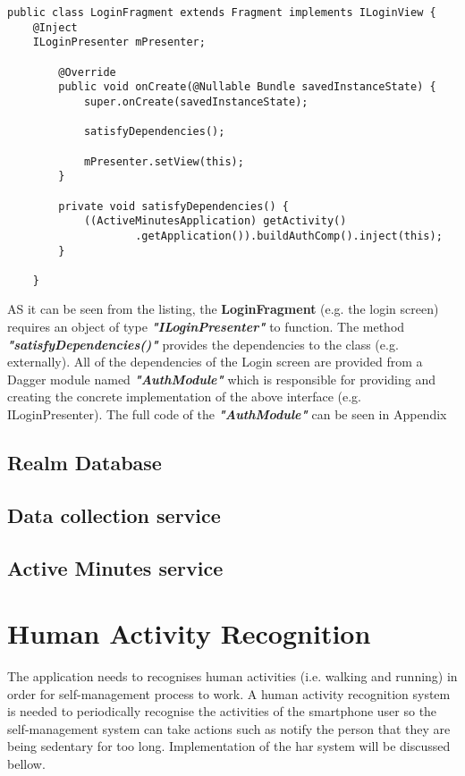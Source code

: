     \begin{lstlisting}[caption=Dependency injection example,
label=di-example,captionpos=b, frame=single,basicstyle=\small,float,floatplacement=H,breaklines=true]
    public class LoginFragment extends Fragment implements ILoginView {
    @Inject
    ILoginPresenter mPresenter;
    
        @Override
        public void onCreate(@Nullable Bundle savedInstanceState) {
            super.onCreate(savedInstanceState);
            
            satisfyDependencies();
            
            mPresenter.setView(this);
        }
        
        private void satisfyDependencies() {
            ((ActiveMinutesApplication) getActivity()
                    .getApplication()).buildAuthComp().inject(this);
        }
    
    }
    \end{lstlisting}
    AS it can be seen from the listing, the \textbf{LoginFragment} (e.g. the login screen) requires an object of type \textit{\textbf{"ILoginPresenter"}} to function. The method \textit{\textbf{"satisfyDependencies()"}} provides the dependencies to the class (e.g. externally). All of the dependencies of the Login screen are provided from a Dagger module named \textit{\textbf{"AuthModule"}} which is responsible for providing and creating the concrete implementation of the above interface (e.g. ILoginPresenter). The full code of the \textit{\textbf{"AuthModule"}} can be seen in Appendix 
    
    \subsection{Realm Database}
    
    \subsection{Data collection service}
    
    \subsection{Active Minutes service}
    


\section{Human Activity Recognition}
The application needs to recognises human activities (i.e. walking and running) in order for self-management process to work. A human activity recognition system is needed to periodically recognise the activities of the smartphone user so the self-management system can take actions such as notify the person that they are being sedentary for too long. Implementation of the \gls{har} system will be discussed bellow.

